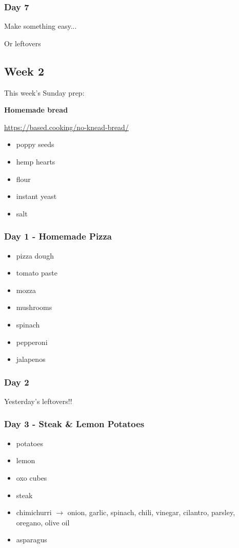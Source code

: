 \documentclass[11pt, a4paper]{article}
\begin{document}
\subsubsection{Day 7}
\vspace{1pc}
\noindent Make something easy...
\par
Or leftovers


\vspace{0.917 pc} %

\pagebreak
\subsection{Week 2}

This week's Sunday prep:
\par
\noindent\textbf{Homemade bread}
\par
\small{\url{https://based.cooking/no-knead-bread/}}
\begin{itemize}
\item poppy seeds
\item hemp hearts
\item flour
\item instant yeast
\item salt
\end{itemize}

\subsubsection{Day 1 - Homemade Pizza}
\vspace{1pc}
\begin{itemize}
\item pizza dough
\item tomato paste
\item mozza
\item mushrooms
\item spinach
\item pepperoni
\item jalapenos
\end{itemize}

\subsubsection{Day 2}
\vspace{1pc}
Yesterday's leftovers!!

\subsubsection{Day 3 - Steak \& Lemon Potatoes}
\vspace{1pc}
\begin{itemize}
\item potatoes
\item lemon
\item oxo cubes
\item steak 
\item chimichurri $\longrightarrow$ onion, garlic, spinach, chili, vinegar, cilantro, parsley, oregano, olive oil 
\item asparagus
\end{itemize}
\end{document}
